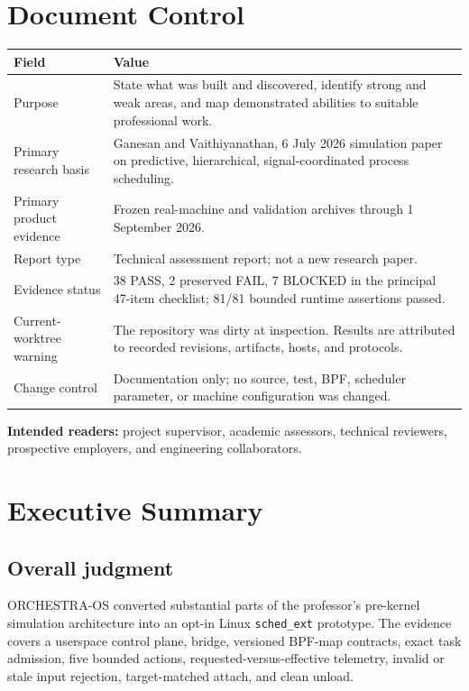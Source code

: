 \documentclass[11pt,a4paper,oneside]{report}
\newcommand{\schedext}{\texttt{sched\_ext}}
\begin{document}
\chapter*{Document Control}
\begin{tabularx}{\textwidth}{@{}p{43mm}Y@{}}
\toprule
\textbf{Field} & \textbf{Value} \\
\midrule
Purpose & State what was built and discovered, identify strong and weak areas,
and map demonstrated abilities to suitable professional work. \\
Primary research basis & Ganesan and Vaithiyanathan, 6 July 2026 simulation
paper on predictive, hierarchical, signal-coordinated process scheduling. \\
Primary product evidence & Frozen real-machine and validation archives through
1 September 2026. \\
Report type & Technical assessment report; not a new research paper. \\
Evidence status & 38 PASS, 2 preserved FAIL, 7 BLOCKED in the principal
47-item checklist; 81/81 bounded runtime assertions passed. \\
Current-worktree warning & The repository was dirty at inspection. Results are
attributed to recorded revisions, artifacts, hosts, and protocols. \\
Change control & Documentation only; no source, test, BPF, scheduler parameter,
or machine configuration was changed. \\
\bottomrule
\end{tabularx}

\vspace{7mm}
\textbf{Intended readers:} project supervisor, academic assessors, technical
reviewers, prospective employers, and engineering collaborators.

\setcounter{tocdepth}{0}
\tableofcontents
\clearpage
{}

\chapter{Executive Summary}

\section{Overall judgment}

ORCHESTRA-OS converted substantial parts of the professor's pre-kernel
simulation architecture into an opt-in Linux \schedext{} prototype. The
evidence covers a userspace control plane, bridge, versioned BPF-map contracts,
exact task admission, five bounded actions, requested-versus-effective
telemetry, invalid or stale input rejection, target-matched attach, and clean
unload.
\end{document}
